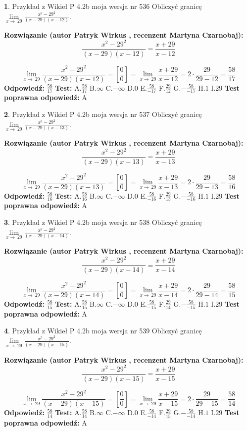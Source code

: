 \documentclass[12pt, a4paper]{article}
\theoremstyle{definition} %
\newtheorem{zad}{}
\newcommand{\zadStart}[1]{\begin{zad}#1\newline}
\newcommand{\zadStop}{\end{zad}}
\newcommand{\rozwStart}[2]{\noindent \textbf{Rozwiązanie (autor #1 , recenzent #2): }\newline}
\newcommand{\rozwStop}{\newline}
\newcommand{\odpStart}{\noindent \textbf{Odpowiedź:}\newline}
\newcommand{\odpStop}{\newline}
\newcommand{\testStart}{\noindent \textbf{Test:}\newline}
\newcommand{\testStop}{\newline}
\newcommand{\kluczStart}{\noindent \textbf{Test poprawna odpowiedź:}\newline}
\newcommand{\kluczStop}{\newline}
\begin{document}
\zadStart{Przykład z Wikieł P 4.2b moja wersja nr 536}
Obliczyć granicę $\lim\limits_{x\to\ 29}\frac{x^{2}-29^{2}}{(x-29)(x-12)}$.
\zadStop
\rozwStart{Patryk Wirkus}{Martyna Czarnobaj}
$$\frac{x^{2}-29^{2}}{(x-29)(x-12)}=\frac{x+29}{x-12}$$

$$\lim\limits_{x\to\ 29}\frac{x^{2}-29^{2}}{(x-29)(x-12)}=[\frac{0}{0}]=\lim\limits_{x\to\ 29}\frac{x+29}{x-12}=2 \cdot \frac{29}{29-12} = \frac{58}{17}$$
\rozwStop
\odpStart
$\frac{58}{17}$
\odpStop
\testStart
A.$\frac{58}{17}$
B.$\infty$
C.$-\infty$
D.$0$
E.$\frac{58}{-17}$
F.$\frac{29}{12}$
G.$-\frac{58}{-17}$
H.$1$
I.$29$
\testStop
\kluczStart
A
\kluczStop



\zadStart{Przykład z Wikieł P 4.2b moja wersja nr 537}
Obliczyć granicę $\lim\limits_{x\to\ 29}\frac{x^{2}-29^{2}}{(x-29)(x-13)}$.
\zadStop
\rozwStart{Patryk Wirkus}{Martyna Czarnobaj}
$$\frac{x^{2}-29^{2}}{(x-29)(x-13)}=\frac{x+29}{x-13}$$

$$\lim\limits_{x\to\ 29}\frac{x^{2}-29^{2}}{(x-29)(x-13)}=[\frac{0}{0}]=\lim\limits_{x\to\ 29}\frac{x+29}{x-13}=2 \cdot \frac{29}{29-13} = \frac{58}{16}$$
\rozwStop
\odpStart
$\frac{58}{16}$
\odpStop
\testStart
A.$\frac{58}{16}$
B.$\infty$
C.$-\infty$
D.$0$
E.$\frac{58}{-16}$
F.$\frac{29}{13}$
G.$-\frac{58}{-16}$
H.$1$
I.$29$
\testStop
\kluczStart
A
\kluczStop



\zadStart{Przykład z Wikieł P 4.2b moja wersja nr 538}
Obliczyć granicę $\lim\limits_{x\to\ 29}\frac{x^{2}-29^{2}}{(x-29)(x-14)}$.
\zadStop
\rozwStart{Patryk Wirkus}{Martyna Czarnobaj}
$$\frac{x^{2}-29^{2}}{(x-29)(x-14)}=\frac{x+29}{x-14}$$

$$\lim\limits_{x\to\ 29}\frac{x^{2}-29^{2}}{(x-29)(x-14)}=[\frac{0}{0}]=\lim\limits_{x\to\ 29}\frac{x+29}{x-14}=2 \cdot \frac{29}{29-14} = \frac{58}{15}$$
\rozwStop
\odpStart
$\frac{58}{15}$
\odpStop
\testStart
A.$\frac{58}{15}$
B.$\infty$
C.$-\infty$
D.$0$
E.$\frac{58}{-15}$
F.$\frac{29}{14}$
G.$-\frac{58}{-15}$
H.$1$
I.$29$
\testStop
\kluczStart
A
\kluczStop



\zadStart{Przykład z Wikieł P 4.2b moja wersja nr 539}
Obliczyć granicę $\lim\limits_{x\to\ 29}\frac{x^{2}-29^{2}}{(x-29)(x-15)}$.
\zadStop
\rozwStart{Patryk Wirkus}{Martyna Czarnobaj}
$$\frac{x^{2}-29^{2}}{(x-29)(x-15)}=\frac{x+29}{x-15}$$

$$\lim\limits_{x\to\ 29}\frac{x^{2}-29^{2}}{(x-29)(x-15)}=[\frac{0}{0}]=\lim\limits_{x\to\ 29}\frac{x+29}{x-15}=2 \cdot \frac{29}{29-15} = \frac{58}{14}$$
\rozwStop
\odpStart
$\frac{58}{14}$
\odpStop
\testStart
A.$\frac{58}{14}$
B.$\infty$
C.$-\infty$
D.$0$
E.$\frac{58}{-14}$
F.$\frac{29}{15}$
G.$-\frac{58}{-14}$
H.$1$
I.$29$
\testStop
\kluczStart
A
\kluczStop
\end{document}
